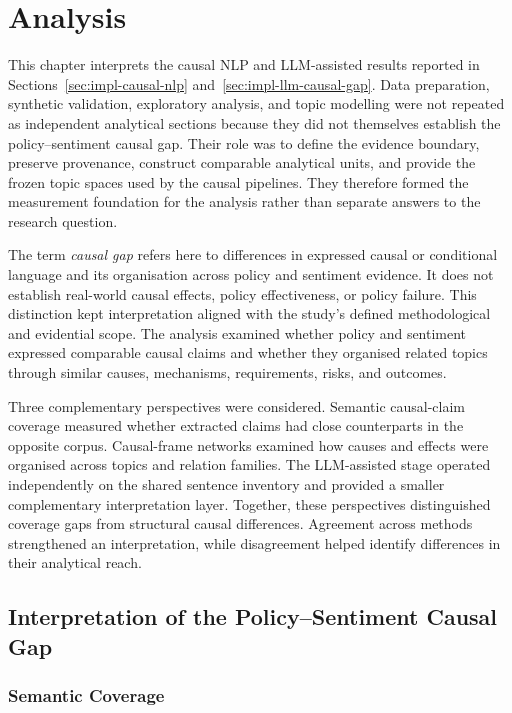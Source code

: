 \chapter{Analysis}
\label{chap:analysis}

\graphicspath{{Chapter4/img/}}
\setlength{\emergencystretch}{2em}

This chapter interprets the causal NLP and LLM-assisted results reported in
Sections~\ref{sec:impl-causal-nlp} and~\ref{sec:impl-llm-causal-gap}. Data
preparation, synthetic validation, exploratory analysis, and topic modelling were
not repeated as independent analytical sections because they did not themselves
establish the policy--sentiment causal gap. Their role was to define the evidence
boundary, preserve provenance, construct comparable analytical units, and provide
the frozen topic spaces used by the causal pipelines. They therefore formed the
measurement foundation for the analysis rather than separate answers to the
research question.

The term \textit{causal gap} refers here to differences in expressed causal or
conditional language and its organisation across policy and sentiment evidence. It
does not establish real-world causal effects, policy effectiveness, or policy
failure. This distinction kept interpretation aligned with the study's defined
methodological and evidential scope. The analysis examined whether policy and
sentiment expressed comparable causal claims and whether they organised related
topics through similar causes, mechanisms, requirements, risks, and outcomes.

Three complementary perspectives were considered. Semantic causal-claim coverage
measured whether extracted claims had close counterparts in the opposite corpus.
Causal-frame networks examined how causes and effects were organised across topics
and relation families. The LLM-assisted stage operated independently on the shared
sentence inventory and provided a smaller complementary interpretation layer.
Together, these perspectives distinguished coverage gaps from structural causal
differences. Agreement across methods strengthened an interpretation, while
disagreement helped identify differences in their analytical reach.

\section{Interpretation of the Policy--Sentiment Causal Gap}
\label{sec:analysis-gap}

\subsection{Semantic Coverage}
\label{subsec:analysis-semantic-coverage}

